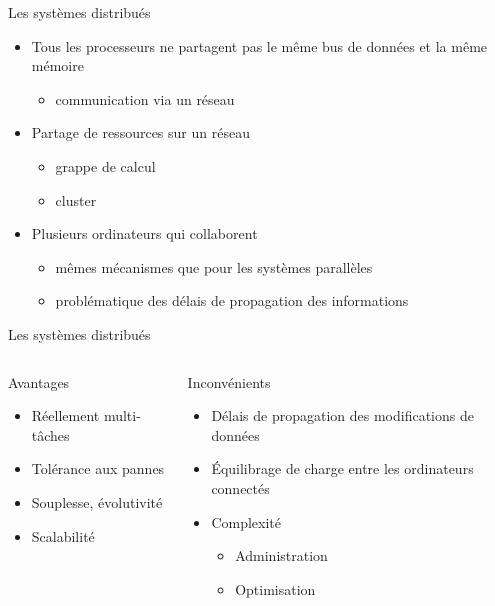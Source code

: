 \begin{frame}{Les systèmes distribués}
\begin{itemize}
\item Tous les processeurs ne partagent pas le même bus de données et la même mémoire
\begin{itemize}
\item communication via un réseau
\end{itemize}
\item Partage de ressources sur un réseau
\begin{itemize}
\item grappe de calcul
\item cluster
\end{itemize}
\item Plusieurs ordinateurs qui collaborent
\begin{itemize}
\item mêmes mécanismes que pour les systèmes parallèles
\item problématique des délais de propagation des informations
\end{itemize}
\end{itemize}
\end{frame}

\begin{frame}{Les systèmes distribués}
\begin{columns}
\begin{block}{Avantages}
\begin{itemize}
\item Réellement multi-tâches
\item Tolérance aux pannes
\item Souplesse, évolutivité
\item Scalabilité
\end{itemize}
\end{block}
\begin{block}{Inconvénients}
\begin{itemize}
\item Délais de propagation des modifications de données
\item Équilibrage de charge entre les ordinateurs connectés
\item Complexité
\begin{itemize}
\item Administration
\item Optimisation
\end{itemize}
\end{itemize}
\end{block}
\end{columns}
\end{frame}

